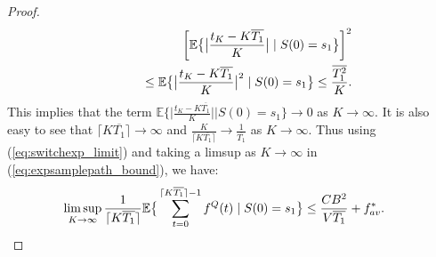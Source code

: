 \documentclass[journal]{IEEEtran}
\newcommand{\expect}[1]{\mathbb{E}\big\{#1\big\}}
\begin{document}
\begin{proof}
\begin{eqnarray}
\hspace{-.3in}&&\bigg[\expect{\big|\frac{t_K-K\overline{T_1}}{K}\big|\left.|\right. S(0)=s_1}\bigg]^2\label{eq:switchexp_limit}\\
\hspace{-.3in}&&\qquad\qquad\leq \expect{\big|\frac{t_K-K\overline{T_1}}{K}\big|^2\left.|\right. S(0)=s_1}
\leq \frac{\overline{T_1^2}}{K}.\nonumber
\end{eqnarray}
This implies that the term $\expect{\big|\frac{t_K-K\overline{T_1}}{K}\big|\left.|\right. S(0)=s_1}\rightarrow0$ as $K\rightarrow\infty$. 
It is also easy to see that $\lceil K\overline{T_1} \rceil\rightarrow\infty$ and $\frac{K}{\lceil K\overline{T_1} \rceil}\rightarrow\frac{1}{\overline{T_1}}$ as $K\rightarrow\infty$.  
Thus using (\ref{eq:switchexp_limit}) and taking a limsup as $K\rightarrow\infty$ in (\ref{eq:expsamplepath_bound}), we have:  
\begin{eqnarray*}
\hspace{-.3in}&&\limsup_{K\rightarrow\infty}\frac{1}{\lceil K\overline{T_1} \rceil}\expect{\sum_{t=0}^{\lceil K\overline{T_1} \rceil-1}f^Q(t)\left.|\right. S(0)=s_1}\leq \frac{CB^2}{V\overline{T_1}} +  f^*_{av}. %
\end{eqnarray*}


\end{proof}
\end{document}
